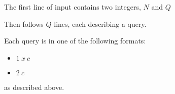 The first line of input contains two integers, $N$ and $Q$

Then follows $Q$ lines, each describing a query.

Each query is in one of the following formats:

\begin{itemize}
\item $1\ x\ c$

\item $2\ c$
\end{itemize}

as described above.